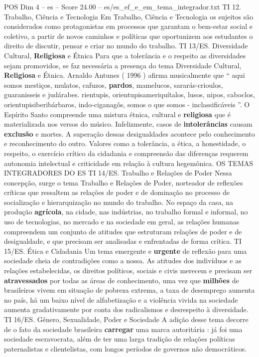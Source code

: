 \begin{textsample}{POS Dim 4 – es – Score 24.00 – es/es\_ef\_e\_em\_tema\_integrador.txt}
TI 12.
Trabalho, Ciência e Tecnologia Em Trabalho, Ciência e Tecnologia os sujeitos são considerados como protagonistas em processos que garantam o bem-estar social e coletivo, a partir de novos caminhos e políticas que oportunizem aos estudantes o direito de discutir, pensar e criar no mundo do trabalho.
TI 13/ES.
Diversidade Cultural, \textbf{Religiosa} e Étnica Para que a tolerância e o respeito as diversidades sejam promovidos, se faz necessária a presença do tema Diversidade Cultural, \textbf{Religiosa} e Étnica.
Arnaldo Antunes ( 1996 ) afirma musicalmente que “ aqui somos mestiços, mulatos, cafuzos, \textbf{pardos}, mamelucos, sararás-crioulos, guaranisseis e judárabes. rientupis, orientupisameriquítalos, lusos, nipos, caboclos, orientupisiberibárbaros, indo-ciganagôs, somos o que somos - inclassificáveis ”.
O Espírito Santo compreende uma mistura étnica, cultural e \textbf{religiosa} que é materializada nos versos do músico.
Infelizmente, casos de \textbf{intolerâncias} causam \textbf{exclusão} e mortes.
A superação dessas desigualdades acontece pelo conhecimento e reconhecimento do outro.
Valores como a tolerância, a ética, a honestidade, o respeito, o exercício crítico da cidadania e compreensão das diferenças requerem autonomia intelectual e criticidade em relação à cultura hegemônica.
OS TEMAS INTEGRADORES DO ES TI 14/ES.
Trabalho e Relações de Poder Nessa concepção, surge o tema Trabalho e Relações de Poder, norteador de reflexões críticas que ressaltem as relações de poder e de dominação no processo de socialização e hierarquização no mundo do trabalho.
No espaço da casa, na produção \textbf{agrícola}, na cidade, nas indústrias, no trabalho formal e informal, no uso de tecnologias, no mercado e na sociedade em geral, as relações humanas compreendem um conjunto de atitudes que estruturam relações de poder e de desigualdade, e que precisam ser analisadas e enfrentadas de forma crítica.
TI 15/ES.
Ética e Cidadania Um tema emergente e \textbf{urgente} de reflexão para uma sociedade cheia de contradições como a nossa.
As atitudes dos indivíduos e as relações estabelecidas, os direitos políticos, sociais e civis merecem e precisam ser \textbf{atravessados} por todas as áreas de conhecimento, uma vez que \textbf{milhões} de brasileiros vivem em situação de pobreza extrema, a taxa de desemprego aumenta no país, há um baixo nível de alfabetização e a violência vivida na sociedade aumenta gradativamente por conta dos radicalismos e desrespeito à diversidade.
TI 16/ES.
Gênero, Sexualidade, Poder e Sociedade A adição desse tema decorre de o fato da sociedade brasileira \textbf{carregar} uma marca autoritária : já foi uma sociedade escravocrata, além de ter uma larga tradição de relações políticas paternalistas e clientelistas, com longos períodos de governos não democráticos.

\end{textsample}
